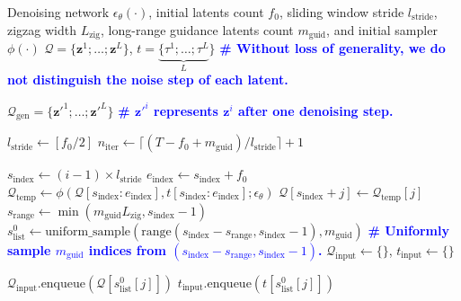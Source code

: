 \documentclass{article}
\theoremstyle{plain}
\theoremstyle{definition}
\theoremstyle{remark}
\begin{document}
\begin{algorithm}[htbp]
\caption{One-step inference over the latents queue incorporates our long-range frame guidance}
\label{alg:fifo_long_range}
\begin{algorithmic}[1]

 Denoising network $\epsilon_{\theta}(\cdot)$, initial latents count $f_0$, sliding window stride $l_{\mathrm{stride}}$, zigzag width $L_{\mathrm{zig}}$, long-range guidance latents count $m_{\mathrm{guid}}$, and initial sampler $\phi(\cdot)$
 $\mathcal{Q} = \{\mathbf{z}^1; \dots; \mathbf{z}^L\}$, $t = \underbrace{\{\tau^1; \dots; \tau^L}_{L}\}$ {\bfseries \textcolor{blue}{\# Without loss of generality, we do not distinguish the noise step of each latent.}}

 $\mathcal{Q}_\mathrm{gen} = \{\mathbf{z'}^1; \dots; \mathbf{z'}^L\}$ {\bfseries \textcolor{blue}{\# $\mathbf{z'}^i$ represents $\mathbf{z}^i$ after one denoising step.}}
\STATE {\bfseries \textcolor{blue}{\# Queue length equals denoising steps $T$.}}

\STATE $l_\mathrm{stride} \gets [f_0/2]$
\STATE $n_\mathrm{iter} \gets \lceil (T - f_0 + m_\mathrm{guid}) / l_\mathrm{stride} \rceil + 1$

        \STATE $s_\mathrm{index} \gets (i-1) \times l_\mathrm{stride}$
            \STATE $e_\mathrm{index} \gets s_\mathrm{index} + f_0$
            \STATE $\mathcal{Q}_\mathrm{temp} \gets \phi(\mathcal{Q}[s_\mathrm{index}:e_\mathrm{index}], t[s_\mathrm{index}:e_\mathrm{index}]; \epsilon_\theta)$
                \STATE $\mathcal{Q}[s_\mathrm{index} + j] \gets \mathcal{Q}_\mathrm{temp}[j]$
            \ENDFOR
        \ELSE
            \STATE $s_\mathrm{range} \gets \min(m_\mathrm{guid} L_{\mathrm{zig}}, s_\mathrm{index}-1)$
            \STATE $s^0_\mathrm{list} \gets \mathrm{uniform\_sample}(\mathrm{range}(s_\mathrm{index}-s_\mathrm{range}, s_\mathrm{index}-1), m_\mathrm{guid})$ {\bfseries \textcolor{blue}{\# Uniformly sample $m_\mathrm{guid}$ indices from $(s_\mathrm{index}-s_\mathrm{range}, s_\mathrm{index}-1)$.}}
            \STATE $\mathcal{Q}_\mathrm{input} \gets \{\}$, \quad $t_\mathrm{input} \gets \{\}$
            
                \STATE $\mathcal{Q}_\mathrm{input}.\text{enqueue}(\mathcal{Q}[s^0_\mathrm{list}[j]])$
                \STATE $t_\mathrm{input}.\text{enqueue}(t[s^0_\mathrm{list}[j]])$
            \ENDFOR


\end{algorithmic}
\end{algorithm}
\end{document}
